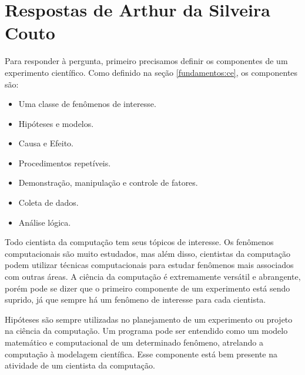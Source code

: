 \section{Respostas de Arthur da Silveira Couto}

Para responder à pergunta, primeiro precisamos definir os componentes de um experimento científico. Como definido na seção \ref{fundamentos:ce}, os componentes são:
\begin{itemize}
    \item Uma classe de fenômenos de interesse.
    \item Hipóteses e modelos.
    \item Causa e Efeito.
    \item Procedimentos repetíveis.
    \item Demonstração, manipulação e controle de fatores.
    \item Coleta de dados.
    \item Análise lógica.
\end{itemize}

Todo cientista da computação tem seus tópicos de interesse. Os fenômenos computacionais são muito estudados, mas além disso, cientistas da computação podem utilizar técnicas computacionais para estudar fenômenos mais associados com outras áreas. A ciência da computação é extremamente versátil e abrangente, porém pode se dizer que o primeiro componente de um experimento está sendo suprido, já que sempre há um fenômeno de interesse para cada cientista.

Hipóteses são sempre utilizadas no planejamento de um experimento ou projeto na ciência da computação. Um programa pode ser entendido como um modelo matemático e computacional de um determinado fenômeno, atrelando a computação à modelagem científica. Esse componente está bem presente na atividade de um cientista da computação.

